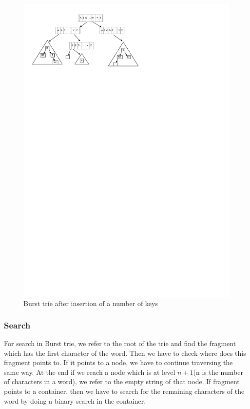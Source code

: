 \documentclass{report}
\begin{document}
\begin{figure}[h]
\includegraphics[scale=0.6]{bursttrie}
\caption{ Burst trie after insertion of a number of keys}

\centering
\end{figure}

\subsubsection{Search}

For search in Burst trie, we refer to the root of the trie and find the fragment which has the first character of the word. Then we have to check where does this fragment points to. If it points to a node, we have to continue traversing the same way. At the end if we reach a node which is at level $n+1$(n is the number of characters in a word), we refer to the empty string of that node. If fragment points to a container, then we have to search for the remaining characters of the word by doing a binary search in the container.
\end{document}
